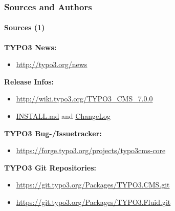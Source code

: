 \begin{frame}[fragile]
	\frametitle{Sources and Authors}
	\framesubtitle{Sources (1)}

	\textbf{TYPO3 News:}
		\begin{itemize}\smaller
			\item \url{http://typo3.org/news}
		\end{itemize}

	\textbf{Release Infos:}
		\begin{itemize}\smaller
			\item \url{http://wiki.typo3.org/TYPO3_CMS_7.0.0}
			\item \href{https://github.com/TYPO3/TYPO3.CMS/blob/master/INSTALL.md}{INSTALL.md} and \href{https://github.com/TYPO3/TYPO3.CMS/blob/master/ChangeLog}{ChangeLog}
		\end{itemize}

	\textbf{TYPO3 Bug-/Issuetracker:}
		\begin{itemize}\smaller
			\item \url{https://forge.typo3.org/projects/typo3cms-core}
		\end{itemize}

	\textbf{TYPO3 Git Repositories:}
		\begin{itemize}\smaller
			\item \url{https://git.typo3.org/Packages/TYPO3.CMS.git}
			\item \url{https://git.typo3.org/Packages/TYPO3.Fluid.git}
		\end{itemize}

\end{frame}


